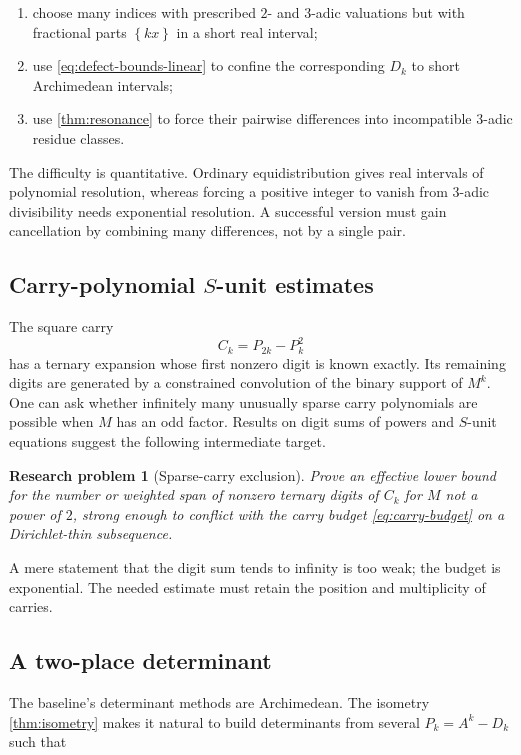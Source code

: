 \documentclass[11pt]{article}
\newtheorem{problem}[theorem]{Research problem}
\theoremstyle{definition}
\theoremstyle{remark}
\newcommand{\fracpart}[1]{\left\{#1\right\}}
\begin{document}
\begin{enumerate}
\item choose many indices with prescribed $2$- and $3$-adic valuations but
with fractional parts $\fracpart{kx}$ in a short real interval;
\item use \eqref{eq:defect-bounds-linear} to confine the corresponding
$D_k$ to short Archimedean intervals;
\item use \cref{thm:resonance} to force their pairwise differences into
incompatible $3$-adic residue classes.
\end{enumerate}

The difficulty is quantitative.  Ordinary equidistribution gives real
intervals of polynomial resolution, whereas forcing a positive integer to
vanish from $3$-adic divisibility needs exponential resolution.  A successful
version must gain cancellation by combining many differences, not by a single
pair.

\subsection{Carry-polynomial $S$-unit estimates}

The square carry
\[
  C_k=P_{2k}-P_k^2
\]
has a ternary expansion whose first nonzero digit is known exactly.  Its
remaining digits are generated by a constrained convolution of the binary
support of $M^k$.  One can ask whether infinitely many unusually sparse carry
polynomials are possible when $M$ has an odd factor.  Results on digit sums of
powers and $S$-unit equations suggest the following intermediate target.

\begin{problem}[Sparse-carry exclusion]
Prove an effective lower bound for the number or weighted span of nonzero
ternary digits of $C_k$ for $M$ not a power of $2$, strong enough to conflict
with the carry budget \eqref{eq:carry-budget} on a Dirichlet-thin subsequence.
\end{problem}

A mere statement that the digit sum tends to infinity is too weak; the budget
is exponential.  The needed estimate must retain the position and
multiplicity of carries.

\subsection{A two-place determinant}

The baseline's determinant methods are Archimedean.  The isometry
\cref{thm:isometry} makes it natural to build determinants from several
$P_k=A^k-D_k$ such that
\end{document}
